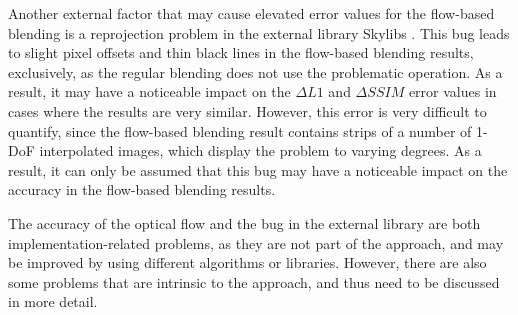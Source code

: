 
Another external factor that may cause elevated error values for the flow-based blending is a reprojection problem in the external library Skylibs \cite{skylibs}. This bug leads to slight pixel offsets and thin black lines in the flow-based blending results, exclusively, as the regular blending does not use the problematic operation. As a result, it may have a noticeable impact on the $\Delta L1$ and $\Delta SSIM$ error values in cases where the results are very similar. However, this error is very difficult to quantify, since the flow-based blending result contains strips of a number of 1-DoF interpolated images, which display the problem to varying degrees. As a result, it can only be assumed that this bug may have a noticeable impact on the accuracy in the flow-based blending results.

The accuracy of the optical flow and the bug in the external library are both implementation-related problems, as they are not part of the approach, and may be improved by using different algorithms or libraries. However, there are also some problems that are intrinsic to the approach, and thus need to be discussed in more detail.

